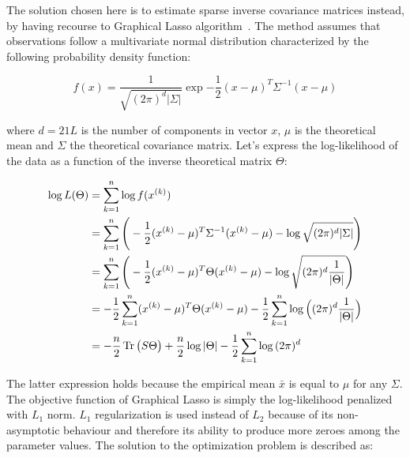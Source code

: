         The solution chosen here is to estimate sparse inverse covariance matrices instead,
        by having recourse to Graphical Lasso algorithm~\cite{graphicalLasso}.
        The method assumes that observations follow a multivariate normal distribution
        characterized by the following probability density function:

        \begin{equation}
            f(x) = \frac{1}{\sqrt{(2\pi)^d \vert\Sigma\vert}} \exp{-\frac{1}{2} (x - \mu)^T \Sigma^{-1} (x - \mu)}
        \end{equation}

        where $d=21L$ is the number of components in vector $x$, $\mu$ is the theoretical mean and $\Sigma$ the theoretical covariance matrix.
        Let's express the log-likelihood of the data as a function of the inverse theoretical matrix $\Theta$:

        \begin{equation}
            \begin{split}
                \log{L}(\Theta) & = \sum\limits_{k=1}^{n} \log{f(x^{(k)})} \\
                & = \sum\limits_{k=1}^{n} \Bigg( -\frac{1}{2} (x^{(k)} - \mu)^T \Sigma^{-1} (x^{(k)} - \mu) - \log{\sqrt{(2\pi)^d \vert\Sigma\vert}} \Bigg) \\
                & = \sum\limits_{k=1}^{n} \Bigg( -\frac{1}{2} (x^{(k)} - \mu)^T \Theta (x^{(k)} - \mu) - \log{\sqrt{(2\pi)^d \frac{1}{\vert\Theta\vert}}} \Bigg) \\
                & = -\frac{1}{2} \sum\limits_{k=1}^{n} (x^{(k)} - \mu)^T \Theta (x^{(k)} - \mu)
                    - \frac{1}{2} \sum\limits_{k=1}^{n} \log{\Big((2\pi)^d \frac{1}{\vert\Theta\vert}\Big)} \\
                & = -\frac{n}{2} \operatorname{Tr}\big(S \Theta\big) + \frac{n}{2} \log{\vert\Theta\vert} - \frac{1}{2} \sum\limits_{k=1}^{n} \log{(2\pi)^d} \\
            \end{split}
        \end{equation}

        The latter expression holds because the empirical mean $\bar{x}$ is equal to $\mu$ for any $\Sigma$.
        The objective function of Graphical Lasso is simply the log-likelihood penalized with $L_1$ norm.
        $L_1$ regularization is used instead of $L_2$ because
        of its non-asymptotic behaviour and therefore its ability to produce more zeroes among the parameter values.
        The solution to the optimization problem is described as:

